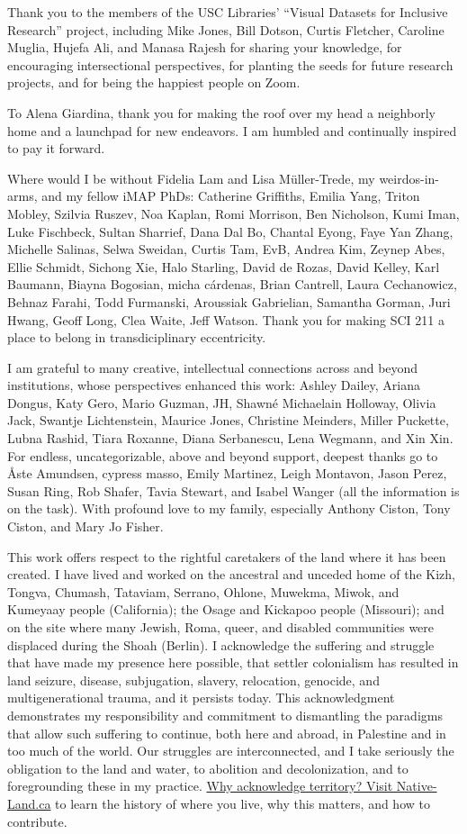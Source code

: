 Thank you to the members of the USC Libraries' ``Visual Datasets for
Inclusive Research'' project, including Mike Jones, Bill Dotson, Curtis
Fletcher, Caroline Muglia, Hujefa Ali, and Manasa Rajesh for sharing
your knowledge, for encouraging intersectional perspectives, for
planting the seeds for future research projects, and for being the
happiest people on Zoom.

To Alena Giardina, thank you for making the roof over my head a
neighborly home and a launchpad for new endeavors. I am humbled and
continually inspired to pay it forward.

Where would I be without Fidelia Lam and Lisa Müller-Trede, my
weirdos-in-arms, and my fellow iMAP PhDs: Catherine Griffiths, Emilia
Yang, Triton Mobley, Szilvia Ruszev, Noa Kaplan, Romi Morrison, Ben
Nicholson, Kumi Iman, Luke Fischbeck, Sultan Sharrief, Dana Dal Bo,
Chantal Eyong, Faye Yan Zhang, Michelle Salinas, Selwa Sweidan, Curtis
Tam, EvB, Andrea Kim, Zeynep Abes, Ellie Schmidt, Sichong Xie, Halo
Starling, David de Rozas, David Kelley, Karl Baumann, Biayna Bogosian,
micha cárdenas, Brian Cantrell, Laura Cechanowicz, Behnaz Farahi, Todd
Furmanski, Aroussiak Gabrielian, Samantha Gorman, Juri Hwang, Geoff
Long, Clea Waite, Jeff Watson. Thank you for making SCI 211 a place to
belong in transdiciplinary eccentricity.

I am grateful to many creative, intellectual connections across and
beyond institutions, whose perspectives enhanced this work: Ashley
Dailey, Ariana Dongus, Katy Gero, Mario Guzman, JH, Shawné Michaelain
Holloway, Olivia Jack, Swantje Lichtenstein, Maurice Jones, Christine
Meinders, Miller Puckette, Lubna Rashid, Tiara Roxanne, Diana
Serbanescu, Lena Wegmann, and Xin Xin. For endless, uncategorizable,
above and beyond support, deepest thanks go to Åste Amundsen, cypress
masso, Emily Martinez, Leigh Montavon, Jason Perez, Susan Ring, Rob
Shafer, Tavia Stewart, and Isabel Wanger (all the information is on the
task). With profound love to my family, especially Anthony Ciston, Tony
Ciston, and Mary Jo Fisher.

This work offers respect to the rightful caretakers of the land where it
has been created. I have lived and worked on the ancestral and unceded
home of the Kizh, Tongva, Chumash, Tataviam, Serrano, Ohlone, Muwekma,
Miwok, and Kumeyaay people (California); the Osage and Kickapoo people
(Missouri); and on the site where many Jewish, Roma, queer, and disabled
communities were displaced during the Shoah (Berlin). I acknowledge the
suffering and struggle that have made my presence here possible, that
settler colonialism has resulted in land seizure, disease, subjugation,
slavery, relocation, genocide, and multigenerational trauma, and it
persists today. This acknowledgment demonstrates my responsibility and
commitment to dismantling the paradigms that allow such suffering to
continue, both here and abroad, in Palestine and in too much of the
world. Our struggles are interconnected, and I take seriously the
obligation to the land and water, to abolition and decolonization, and
to foregrounding these in my practice.
\href{https://native-land.ca/resources/territory-acknowledgement/}{Why
acknowledge territory? Visit Native-Land.ca} to learn the history of
where you live, why this matters, and how to contribute.
